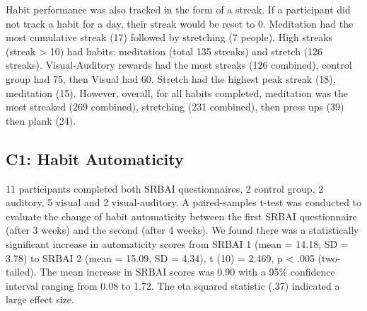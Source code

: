 \documentclass{scaffold/sigchi}
\begin{document}
Habit performance was also tracked in the form of a streak. If a participant did not track a habit for a day, their streak would be reset to 0. Meditation had the most cumulative streak (17) followed by stretching (7 people). High streaks (streak > 10) had habits: meditation (total 135 streaks) and stretch (126 streaks). Visual-Auditory rewards had the most streaks (126 combined), control group had 75, then Visual had 60. Stretch had the highest peak streak (18), meditation (15). However, overall, for all habits completed, meditation was the most streaked (269 combined), stretching (231 combined), then press ups (39) then plank (24).

\subsection{C1: Habit Automaticity}
11 participants completed both SRBAI questionnaires, 2 control group, 2 auditory, 5 visual and 2 visual-auditory. A paired-samples t-test was conducted to evaluate the change of habit automaticity between the first SRBAI questionnaire (after 3 weeks) and the second (after 4 weeks). We found there was a statistically significant increase in automaticity scores from SRBAI 1 (mean = 14.18, SD = 3.78) to SRBAI 2 (mean = 15.09, SD = 4.34), t (10) = 2.469, p < .005 (two-tailed). The mean increase in SRBAI scores was 0.90 with a 95\% confidence interval ranging from 0.08 to 1.72. The eta squared statistic (.37) indicated a large effect size.


\end{document}
